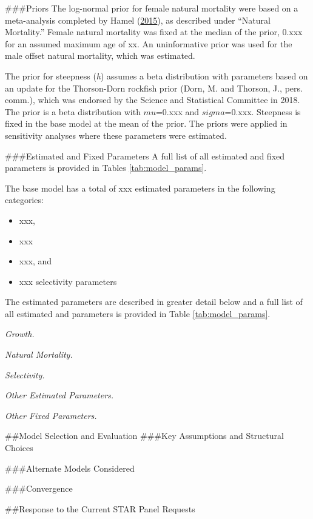 \documentclass[12pt,]{article}
\begin{document}
\#\#\#Priors The log-normal prior for female natural mortality were
based on a meta-analysis completed by Hamel
(\protect\hyperlink{ref-Hamel2015}{2015}), as described under ``Natural
Mortality.'' Female natural mortality was fixed at the median of the
prior, 0.xxx for an assumed maximum age of xx. An uninformative prior
was used for the male offset natural mortality, which was estimated.

The prior for steepness (\emph{h}) assumes a beta distribution with
parameters based on an update for the Thorson-Dorn rockfish prior (Dorn,
M. and Thorson, J., pers. comm.), which was endorsed by the Science and
Statistical Committee in 2018. The prior is a beta distribution with
\(mu\)=0.xxx and \(sigma\)=0.xxx. Steepness is fixed in the base model
at the mean of the prior. The priors were applied in sensitivity
analyses where these parameters were estimated.

\#\#\#Estimated and Fixed Parameters A full list of all estimated and
fixed parameters is provided in Tables \ref{tab:model_params}.

The base model has a total of xxx estimated parameters in the following
categories:

\begin{itemize}
  \item xxx,
  \item xxx
  \item xxx, and
  \item xxx selectivity parameters
\end{itemize}

The estimated parameters are described in greater detail below and a
full list of all estimated and parameters is provided in Table
\ref{tab:model_params}.

\emph{Growth.}

\emph{Natural Mortality.}

\emph{Selectivity.}

\emph{Other Estimated Parameters.}

\emph{Other Fixed Parameters.}

\#\#Model Selection and Evaluation \#\#\#Key Assumptions and Structural
Choices

\#\#\#Alternate Models Considered

\#\#\#Convergence

\#\#Response to the Current STAR Panel Requests
\end{document}
